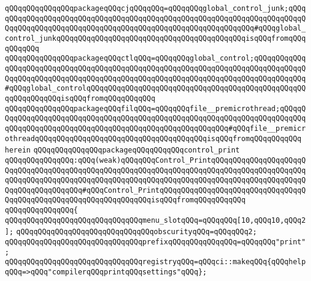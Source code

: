\verb|qQQqqQQqqQQqqQQqpackageqQQqcjqQQqqQQq=qQQqqQQqglobal_control_junk;qQQqqQQqqQQqqQQqqQQqqQQqqQQqqQQqqQQqqQQqqQQqqQQqqQQqqQQqqQQqqQQqqQQqqQQqqQQqqQQqqQQqqQQqqQQqqQQqqQQqqQQqqQQqqQQqqQQqqQQqqQQqqQQqqQQq#qQQqglobal_control_junkqQQqqQQqqQQqqQQqqQQqqQQqqQQqqQQqqQQqqQQqqQQqisqQQqfromqQQqqQQqqQQq|\newline
\verb|qQQqqQQqqQQqqQQqpackageqQQqctlqQQq=qQQqqQQqglobal_control;qQQqqQQqqQQqqQQqqQQqqQQqqQQqqQQqqQQqqQQqqQQqqQQqqQQqqQQqqQQqqQQqqQQqqQQqqQQqqQQqqQQqqQQqqQQqqQQqqQQqqQQqqQQqqQQqqQQqqQQqqQQqqQQqqQQqqQQqqQQqqQQqqQQqqQQq#qQQqglobal_controlqQQqqQQqqQQqqQQqqQQqqQQqqQQqqQQqqQQqqQQqqQQqqQQqqQQqqQQqqQQqqQQqisqQQqfromqQQqqQQqqQQq|\newline
\verb|qQQqqQQqqQQqqQQqpackageqQQqfilqQQq=qQQqqQQqfile__premicrothread;qQQqqQQqqQQqqQQqqQQqqQQqqQQqqQQqqQQqqQQqqQQqqQQqqQQqqQQqqQQqqQQqqQQqqQQqqQQqqQQqqQQqqQQqqQQqqQQqqQQqqQQqqQQqqQQqqQQqqQQqqQQqqQQq#qQQqfile__premicrothreadqQQqqQQqqQQqqQQqqQQqqQQqqQQqqQQqqQQqqQQqisqQQqfromqQQqqQQqqQQq|\newline
\verb|herein|\newline
\newline
\verb|qQQqqQQqqQQqqQQqpackageqQQqqQQqqQQqcontrol_print|\newline
\verb|qQQqqQQqqQQqqQQq:qQQq(weak)qQQqqQQqControl_PrintqQQqqQQqqQQqqQQqqQQqqQQqqQQqqQQqqQQqqQQqqQQqqQQqqQQqqQQqqQQqqQQqqQQqqQQqqQQqqQQqqQQqqQQqqQQqqQQqqQQqqQQqqQQqqQQqqQQqqQQqqQQqqQQqqQQqqQQqqQQqqQQqqQQqqQQqqQQqqQQqqQQqqQQqqQQqqQQqqQQq#qQQqControl_PrintqQQqqQQqqQQqqQQqqQQqqQQqqQQqqQQqqQQqqQQqqQQqqQQqqQQqqQQqqQQqqQQqqQQqisqQQqfromqQQqqQQqqQQq|\newline
\verb|qQQqqQQqqQQqqQQq{|\newline
\verb|qQQqqQQqqQQqqQQqqQQqqQQqqQQqqQQqmenu_slotqQQq=qQQqqQQq[10,qQQq10,qQQq2];|\newline
\verb|qQQqqQQqqQQqqQQqqQQqqQQqqQQqqQQqobscurityqQQq=qQQqqQQq2;|\newline
\verb|qQQqqQQqqQQqqQQqqQQqqQQqqQQqqQQqprefixqQQqqQQqqQQqqQQq=qQQqqQQq"print";|\newline
\newline
\verb|qQQqqQQqqQQqqQQqqQQqqQQqqQQqqQQqregistryqQQq=qQQqci::makeqQQq{qQQqhelpqQQq=>qQQq"compilerqQQqprintqQQqsettings"qQQq};|\newline
